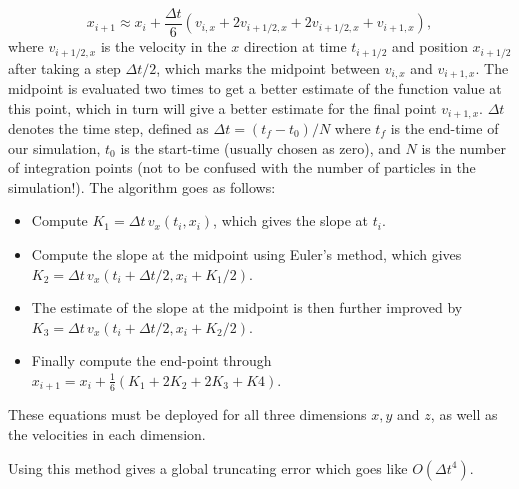 \documentclass{article}
\begin{document}
\begin{multicols}{2}
\begin{equation}
	x_{i+1} \approx x_i + \frac{\Delta t}{6} (v_{i,x} + 2 v_{i + 1/2,x} + 2 v_{i + 1/2,x} + v_{i+1,x}),
\end{equation}
where $v_{i + 1/2,x} $ is the velocity in the $x$ direction at time $t_{i + 1/2}$ and position $x_{i + 1/2}$ after taking a step $\Delta t/2$, which marks the midpoint between $v_{i,x}$ and $v_{i+1,x}$. The midpoint is evaluated two times to get a better estimate of the function value at this point, which in turn will give a better estimate for the final point $v_{i+1,x}$. $\Delta t$ denotes the time step, defined as $\Delta t = (t_f - t_0)/N$ where $t_f$ is the end-time of our simulation, $t_0$ is the start-time (usually chosen as zero), and $N$ is the number of integration points (not to be confused with the number of particles in the simulation!). The algorithm goes as follows:

\begin{itemize}
	\item Compute $K_1 = \Delta t \, v_x(t_i,x_i)$, which gives the slope at $t_i$.
	\item Compute the slope at the midpoint using Euler's method, which gives $K_2 = \Delta t \, v_x(t_i + \Delta t/2, x_i + K_1/2)$.
	\item The estimate of the slope at the midpoint is then further improved by $K_3 = \Delta t \, v_x(t_i + \Delta t/2, x_i + K_2/2)$.
	\item Finally compute the end-point through \\ $x_{i+1} = x_i + \frac{1}{6}(K_1 + 2K_2 + 2K_3 + K4)$.
\end{itemize}
These equations must be deployed for all three dimensions $x,y$ and $z$, as well as the velocities in each dimension.

Using this method gives a global truncating error which goes like $O(\Delta t^4)$. 



\end{multicols}
\end{document}
